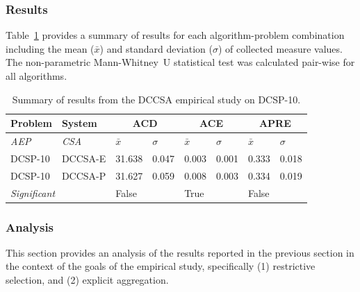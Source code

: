 %
%
\subsubsection{Results}
Table~\ref{tab:cells:ccsa:dccsa} provides a summary of results for each algorithm-problem combination including the mean ($\bar{x}$) and standard deviation ($\sigma$) of collected measure values. The non-parametric Mann-Whitney~U statistical test was calculated pair-wise for all algorithms. 

\begin{table}[htp]
	\centering\small
		\begin{tabular}{llllllll}
		\toprule
		\textbf{Problem} & \textbf{System} & \multicolumn{2}{c}{\textbf{ACD}} & \multicolumn{2}{c}{\textbf{ACE}} & \multicolumn{2}{c}{\textbf{APRE}}\\
		\midrule
		\emph{AEP} & \emph{CSA} & $\bar{x}$ & $\sigma$ & $\bar{x}$ & $\sigma$ & $\bar{x}$ & $\sigma$\\
		\toprule
		DCSP-10 & DCCSA-E & 31.638 & 0.047 & 0.003 & 0.001 & 0.333 & 0.018 \\
		DCSP-10 & DCCSA-P & 31.627 & 0.059 & 0.008 & 0.003 & 0.334 & 0.019 \\
		\multicolumn{2}{l}{\emph{Significant}} & False &  & True &  & False & \\
		\bottomrule
		\end{tabular}
	\caption{Summary of results from the DCCSA empirical study on DCSP-10.}
	\label{tab:cells:ccsa:dccsa}
\end{table}


%
%
\subsubsection{Analysis}
This section provides an analysis of the results reported in the previous section in the context of the goals of the empirical study, specifically (1) restrictive selection, and (2) explicit aggregation. 

%
%
